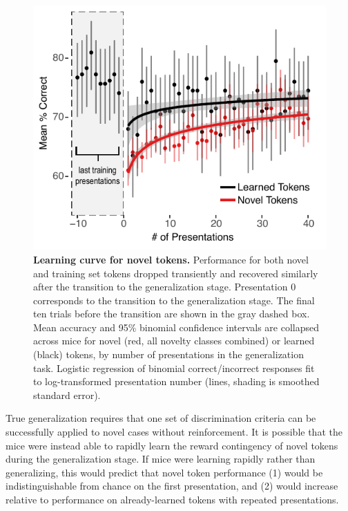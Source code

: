 \documentclass[preprint, NumberedRefs]{JASAnew}\usepackage[]{graphicx}\usepackage[]{color}
\begin{document}
\begin{figure}
\includegraphics[width=\reprintcolumnwidth]{../figures/Figure3.pdf}
\caption{\textbf{Learning curve for novel tokens.} Performance for both novel and training set tokens dropped transiently and recovered similarly after the transition to the generalization stage. Presentation 0 corresponds to the transition to the generalization stage. The final ten trials before the transition are shown in the gray dashed box. Mean accuracy and 95\% binomial confidence intervals are collapsed across mice for novel (red, all novelty classes combined) or learned (black) tokens, by number of presentations in the generalization task. Logistic regression of binomial correct/incorrect responses fit to log-transformed presentation number (lines, shading is smoothed standard error).}
\label{lc}
\end{figure}

True generalization requires that one set of discrimination criteria can be successfully applied to novel cases without reinforcement. It is possible that the mice were instead able to rapidly learn the reward contingency of novel tokens during the generalization stage. If mice were learning rapidly rather than generalizing, this would predict that novel token performance (1) would be indistinguishable from chance on the first presentation, and (2) would increase relative to performance on already-learned tokens with repeated presentations.
\end{document}
